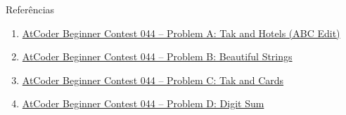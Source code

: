 \begin{frame}[fragile]{Referências}

    \begin{enumerate}
        \item \href{https://atcoder.jp/contests/abc044/tasks/abc044_a}{AtCoder Beginner Contest 
            044 -- Problem A: Tak and Hotels (ABC Edit)}

        \item \href{https://atcoder.jp/contests/abc044/tasks/abc044_b}{AtCoder Beginner Contest 
            044 -- Problem B: Beautiful Strings}

        \item \href{https://atcoder.jp/contests/abc042/tasks/arc060_a}{AtCoder Beginner Contest
            044 -- Problem C: Tak and Cards}

        \item \href{https://atcoder.jp/contests/abc042/tasks/arc060_b}{AtCoder Beginner Contest
            044 -- Problem D: Digit Sum}
    \end{enumerate}

\end{frame}
